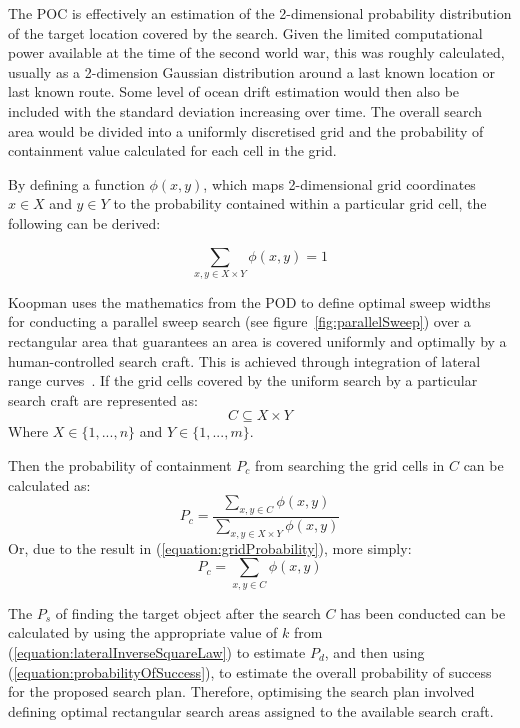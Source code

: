 \documentclass[10pt,a4paper, oneside, conference]{IEEEtran}
\begin{document}
	The POC is effectively an estimation of the 2-dimensional probability distribution of the target location covered by the search.
	Given the limited computational power available at the time of the second world war, this was roughly calculated, usually as a 2-dimension Gaussian distribution around a last known location or last known route.
	Some level of ocean drift estimation would then also be included with the standard deviation increasing over time.
	The overall search area would be divided into a uniformly discretised grid and the probability of containment value calculated for each cell in the grid.
	
	By defining a function $\phi(x,y)$, which maps 2-dimensional grid coordinates $x\in X$ and $y\in Y$ to the probability contained within a particular grid cell, the following can be derived:
	
	\begin{equation}
	\label{equation:gridProbability}
	\sum_{x,y\in X\times Y}\phi(x,y)=1
	\end{equation}
	
	Koopman uses the mathematics from the POD to define optimal sweep widths for conducting a parallel sweep search (see figure~\ref{fig:parallelSweep}) over a rectangular area that guarantees an area is covered uniformly and optimally by a human-controlled search craft. 
	This is achieved through integration of lateral range curves~\cite{doi:10.1287/opre.5.5.613}.
	If the grid cells covered by the uniform search by a particular search craft are represented as:
	$$
	C \subseteq X \times Y
	$$
	Where $X\in \{1,...,n\}$ and $Y\in \{1,...,m\}$.
	
	Then the probability of containment $P_c$ from searching the grid cells in $C$ can be calculated as:
	\begin{equation}
	\label{equation:gridPOC}
	P_c=\frac{\sum_{x,y\in C}\phi(x,y)}{\sum_{x,y\in X\times Y}\phi(x,y)}
	\end{equation}
	Or, due to the result in (\ref{equation:gridProbability}), more simply:
	\begin{equation}
	\label{equation:gridPOC}
	P_c=\sum_{x,y\in C}\phi(x,y)
	\end{equation}
	
	The $P_s$ of finding the target object after the search $C$ has been conducted can be calculated by using the appropriate value of $k$ from (\ref{equation:lateralInverseSquareLaw}) to estimate $P_d$, and then using (\ref{equation:probabilityOfSuccess}), to estimate the overall probability of success for the proposed search plan.
	Therefore, optimising the search plan involved defining optimal rectangular search areas assigned to the available search craft.
	
\end{document}
